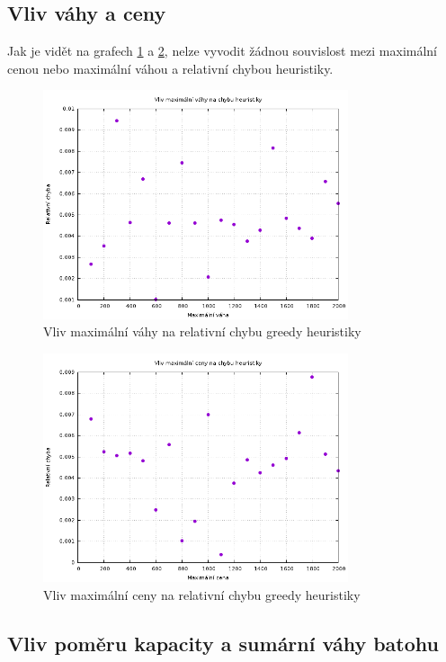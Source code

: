 \documentclass[11pt]{article}
\begin{document}
\subsection{Vliv váhy a ceny}

Jak je vidět na grafech \ref{fig:werror} a \ref{fig:perror}, nelze vyvodit žádnou souvislost mezi maximální cenou nebo maximální váhou a relativní chybou heuristiky. 

\begin{figure}[h!]
	\centering
    	\includegraphics[width=0.8\textwidth]{../data/werror.png}
	\caption{Vliv maximální váhy na relativní chybu greedy heuristiky}
	\label{fig:werror}
\end{figure}


\begin{figure}[h!]
	\centering
    	\includegraphics[width=0.8\textwidth]{../data/perror.png}
	\caption{Vliv maximální ceny na relativní chybu greedy heuristiky}
	\label{fig:perror}
\end{figure}

\subsection{Vliv poměru kapacity a sumární váhy batohu}
\label{sec:merror_sec}
\end{document}
